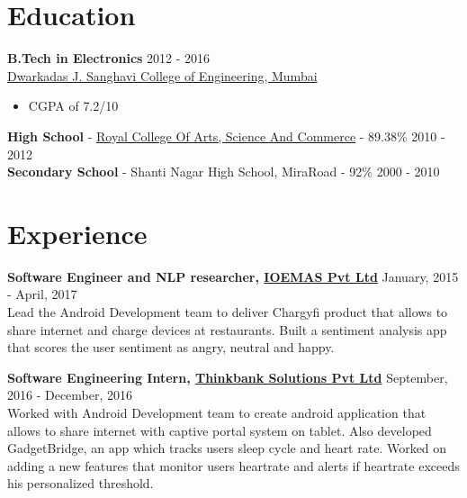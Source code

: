\documentclass[margin, centered]{res}
\begin{document}
\vspace{-7mm}
\begin{resume}
\section{Education}
\textbf{B.Tech in Electronics} \hfill 2012 - 2016 \\
\href{http://www.djsce.ac.in/}{Dwarkadas J. Sanghavi College of Engineering, Mumbai}
\begin{itemize}
 \item CGPA of {7.2}/10 
\end{itemize}
\textbf{High School} - \href{http://royalcollegemiraroad.edu.in/}{Royal College Of Arts, Science And Commerce} - 89.38\% \hfill 2010 - 2012 \\
\textbf{Secondary School} - Shanti Nagar High School, MiraRoad - 92\% \hfill 2000 - 2010

\section{Experience}
\textbf{Software Engineer and NLP researcher, \href{www.google.com}{IOEMAS Pvt Ltd}} \hfill January, 2015 - April, 2017\\
Lead the Android Development team to deliver Chargyfi product that allows to share internet and charge devices at restaurants. Built a sentiment analysis app that scores the user sentiment as angry, neutral and happy.

\textbf{Software Engineering Intern, \href{www.google.com}{Thinkbank Solutions Pvt Ltd}} \hfill September, 2016 - December, 2016\\
Worked with Android Development team to create android application that allows to share internet with captive portal system on tablet.
Also developed GadgetBridge, an app which tracks users sleep cycle and heart rate. Worked on adding a new features that monitor users heartrate and alerts if heartrate exceeds his personalized threshold.\\



\end{resume}
\end{document}
